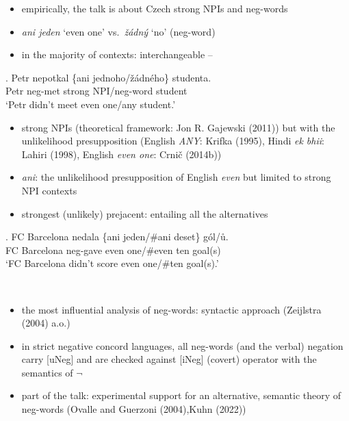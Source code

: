 \documentclass[
  ignorenonframetext,
]{beamer}
\providecommand{\tightlist}{%
  \setlength{\itemsep}{0pt}\setlength{\parskip}{0pt}}\usepackage{longtable,booktabs,array}
\begin{document}
\begin{frame}
\begin{itemize}
\tightlist
\item
  empirically, the talk is about Czech strong NPIs and neg-words
\item
  \emph{ani jeden} `even one' vs.~\textit{žádný} `no' (neg-word)
\item
  in the majority of contexts: interchangeable -- \Next
\end{itemize}

\exg. Petr nepotkal \{ani jednoho/žádného\} studenta.\\
Petr neg-met strong NPI/neg-word student\\
`Petr didn't meet even one/any student.'

\begin{itemize}
\tightlist
\item
  strong NPIs (theoretical framework: Jon R. Gajewski (2011)) but with
  the unlikelihood presupposition (English \emph{ANY}: Krifka (1995),
  Hindi \emph{ek bhii}: Lahiri (1998), English \emph{even one}: Crnič
  (2014b))
\end{itemize}
\end{frame}

\begin{frame}
\begin{itemize}
\tightlist
\item
  \emph{ani}: the unlikelihood presupposition of English \emph{even} but
  limited to strong NPI contexts
\item
  strongest (unlikely) prejacent: entailing all the alternatives
\end{itemize}

\exg. FC Barcelona nedala \{ani jeden/\#ani deset\} gól/ů.\\
FC Barcelona neg-gave even one/\#even ten goal(s)\\
`FC Barcelona didn't score even one/\#ten goal(s).'

~
\end{frame}

\begin{frame}
\begin{itemize}
\tightlist
\item
  the most influential analysis of neg-words: syntactic approach
  (Zeijlstra (2004) a.o.)
\item
  in strict negative concord languages, all neg-words (and the verbal)
  negation carry {[}uNeg{]} and are checked against {[}iNeg{]} (covert)
  operator with the semantics of \(\neg\)
\item
  part of the talk: experimental support for an alternative, semantic
  theory of neg-words (Ovalle and Guerzoni (2004),Kuhn (2022))
\end{itemize}
\end{frame}
\end{document}
